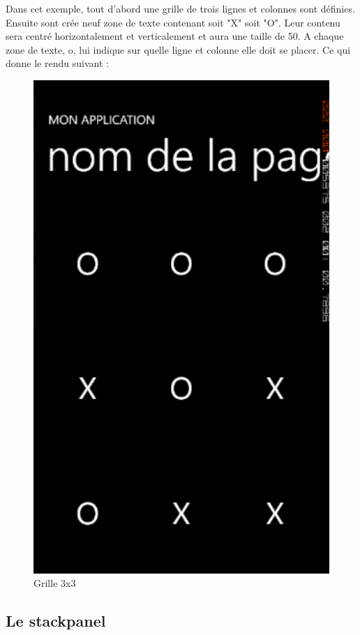 \documentclass[twoside,UTF8]{EPURapport}
\begin{document}
Dans cet exemple, tout d'abord une grille de trois lignes et colonnes sont définies. Ensuite sont crée neuf zone de texte contenant soit "X" soit "O". Leur contenu sera centré horizontalement et verticalement et aura une taille de 50. A chaque zone de texte, o, lui indique sur quelle ligne et colonne elle doit se placer. Ce qui donne le rendu suivant : 
\begin{figure}[H]
	\center
	\includegraphics[scale=0.3]{images/morpion.png}
	\caption{Grille 3x3}
\end{figure}

		
		\subsection{Le stackpanel}
		
\end{document}
